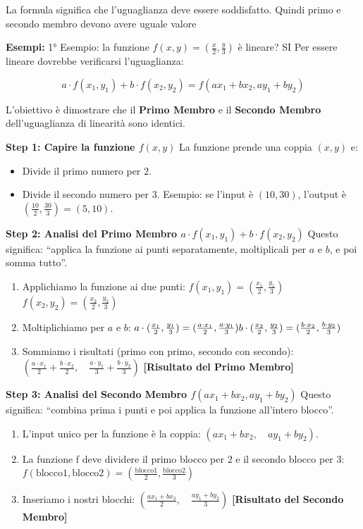 \documentclass[
]{article}
\providecommand{\tightlist}{%
  \setlength{\itemsep}{0pt}\setlength{\parskip}{0pt}}
\begin{document}
La formula significa che l'uguaglianza deve essere soddisfatto. Quindi primo e secondo membro devono avere uguale valore

\textbf{Esempi:}
1° Esempio: la funzione \(f(x,y) = (\frac{x}{2}, \frac{y}{3})\) è lineare? SI
Per essere lineare dovrebbe verificarsi l'uguaglianza:

\[
a \cdot f(x_1,y_1)+b \cdot f(x_2,y_2)=f(ax_1+bx_2,ay_1+by_2)
\]

L'obiettivo è dimostrare che il \textbf{Primo Membro} e il \textbf{Secondo Membro} dell'uguaglianza di linearità sono identici.

\textbf{Step 1: Capire la funzione \(f(x,y)\)}
La funzione prende una coppia \((x, y)\) e:

\begin{itemize}
\tightlist
\item
  Divide il primo numero per \(2\).
\item
  Divide il secondo numero per \(3\).
  Esempio: se l'input è \((10, 30)\), l'output è \((\frac{10}{2}, \frac{30}{3}) = (5, 10)\).
\end{itemize}

\textbf{Step 2: Analisi del Primo Membro \(a \cdot f(x_1, y_1) + b \cdot f(x_2, y_2)\)}
Questo significa: ``applica la funzione ai punti separatamente, moltiplicali per \(a\) e \(b\), e poi somma tutto''.

\begin{enumerate}
\def\labelenumi{\arabic{enumi}.}
\tightlist
\item
  Applichiamo la funzione ai due punti:
  \(f(x_1, y_1) = (\frac{x_1}{2}, \frac{y_1}{3})\)
  \(f(x_2, y_2) = (\frac{x_2}{2}, \frac{y_2}{3})\)
\item
  Moltiplichiamo per \(a\) e \(b\):
  \(a \cdot (\frac{x_1}{2}, \frac{y_1}{3}) = (\frac{a \cdot x_1}{2}, \frac{a \cdot y_1}{3}) \\ b \cdot (\frac{x_2}{2}, \frac{y_2}{3}) = (\frac{b \cdot x_2}{2}, \frac{b \cdot y_2}{3})\)
\item
  Sommiamo i risultati (primo con primo, secondo con secondo):
  \((\frac{a \cdot x_1}{2} + \frac{b \cdot x_2}{2}, \quad \frac{a \cdot y_1}{3} + \frac{b \cdot y_2}{3})\)
  \textbf{{[}Risultato del Primo Membro{]}}
\end{enumerate}

\textbf{Step 3: Analisi del Secondo Membro \(f(a x_1 + b x_2, a y_1 + b y_2)\)}
Questo significa: ``combina prima i punti e poi applica la funzione all'intero blocco''.

\begin{enumerate}
\def\labelenumi{\arabic{enumi}.}
\tightlist
\item
  L'input unico per la funzione è la coppia: \((a x_1 + b x_2, \quad a y_1 + b y_2)\).
\item
  La funzione f deve dividere il primo blocco per \(2\) e il secondo blocco per \(3\):
  \(f( \text{blocco1}, \text{blocco2} ) = ( \frac{\text{blocco1}}{2}, \frac{\text{blocco2}}{3} )\)
\item
  Inseriamo i nostri blocchi:
  \((\frac{a x_1 + b x_2}{2}, \quad \frac{a y_1 + b y_2}{3})\)
  \textbf{{[}Risultato del Secondo Membro{]}}
\end{enumerate}
\end{document}
